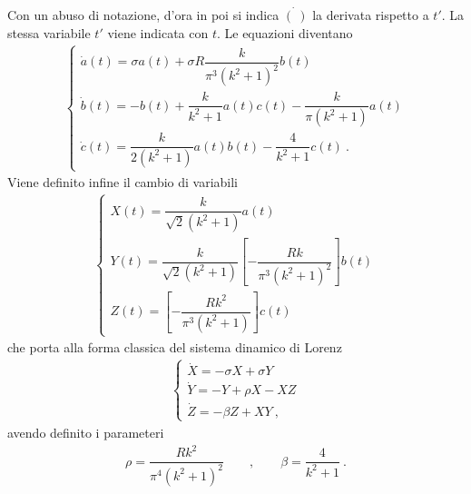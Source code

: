 \documentclass[letterpaper,10pt,italian]{jupyterBook}
\begin{document}
\sphinxAtStartPar
Con un abuso di notazione,
d’ora in poi si indica \(\dot{(\ )}\) la derivata rispetto a \(t'\). La
stessa variabile \(t'\) viene indicata con \(t\). Le equazioni diventano
\begin{equation*}
\begin{split}\begin{cases}
    \dot{a}(t) = \sigma a(t) +  \sigma R \dfrac{k}{\pi^3 (k^2+1)^2} b(t) \\
    \dot{b}(t) = - b(t) + \dfrac{ k}{k^2+1} a(t)c(t)  - \dfrac{ k}{\pi(k^2+1)} a(t)  \\
    \dot{c}(t) = \dfrac{k}{2(k^2+1)} a(t) b(t) - \dfrac{4}{k^2+1}  c(t) \ .
\end{cases}\end{split}
\end{equation*}
\sphinxAtStartPar
Viene definito infine il cambio di variabili
\begin{equation*}
\begin{split}\begin{cases}
     X(t) = \dfrac{k}{\sqrt{2}(k^2+1)} a(t) \\
     Y(t) = \dfrac{k}{\sqrt{2}(k^2+1)}
     \left[-\dfrac{R k}{\pi^3 (k^2+1)^2}\right] b(t) \\
     Z(t) = \left[-\dfrac{R k^2}{\pi^3 (k^2+1)}\right] c(t)
\end{cases}\end{split}
\end{equation*}
\sphinxAtStartPar
che porta alla forma classica del sistema dinamico di
Lorenz
\begin{equation*}
\begin{split}\begin{cases}
      \dot{X} = - \sigma X + \sigma Y \\
      \dot{Y} = - Y + \rho X - X Z \\
      \dot{Z} = - \beta Z + X Y \ ,
    \end{cases}\end{split}
\end{equation*}
\sphinxAtStartPar
avendo definito i parameteri
\begin{equation*}
\begin{split}\rho = \dfrac{R k^2}{\pi^4 (k^2+1)^2} \qquad , \qquad
    \beta = \dfrac{4}{k^2+1} \ .\end{split}
\end{equation*}
\sphinxstepscope
\end{document}
